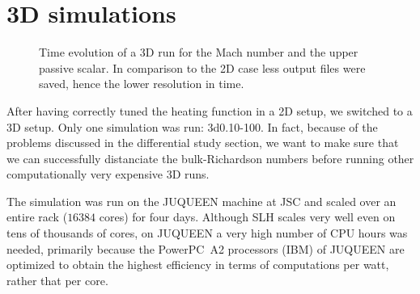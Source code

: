 \section{3D simulations}
\begin{figure}[b!]
      \centering
     \centering
	\hfill
	\caption{Time evolution of a 3D run for the Mach number and the upper passive scalar. In comparison to the 2D case less output files were saved, hence the lower resolution in time.}
	\label{fig:3dsingle}
\end{figure}
After having correctly tuned the heating function in a 2D setup, we switched to a 3D setup. Only one simulation was run: 3d0.10-100. In fact, because of the problems discussed in the differential study section, we want to make sure that we can successfully distanciate the bulk-Richardson numbers before running other computationally very expensive 3D runs.

 The simulation was run on the JUQUEEN machine at JSC and scaled over an entire rack ($16384$ cores) for four days. Although SLH scales very well even on tens of thousands of cores, on JUQUEEN a very high number of CPU hours was needed, primarily because the PowerPC\textregistered \ A2 processors (IBM) of JUQUEEN are optimized to obtain the highest efficiency in terms of computations per watt, rather that per core. 
 
